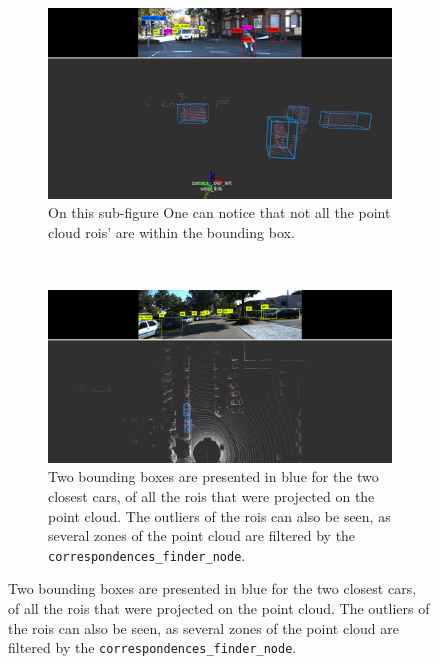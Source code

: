 \begin{figure}[!ht]\ContinuedFloat
	\centering	
	\begin{subfigure}[c]{0.8\textwidth}
		\includegraphics[width=\textwidth]{img/image-object-to-point-cloud/bboxes-front-view.png}
		\caption{On this sub-figure One can notice that not all the point cloud \acp{roi}' are within the bounding box.}
		\label{fig:bboxes-3d-kitti-front}
	\end{subfigure}
	\\ \vspace{4mm}
	\begin{subfigure}[c]{0.8\textwidth}
		\includegraphics[width=\textwidth]{img/image-object-to-point-cloud/bboxes-top-view.png}
		\caption{Two bounding boxes are presented in blue for the two closest cars, of all the \acp{roi} that were projected on the point cloud. The outliers of the \acp{roi} can also be seen, as several zones of the point cloud are filtered by the \texttt{correspondences\_finder\_node}.}
		\label{fig:bboxes-3d-kitti-top}
	\end{subfigure}

\end{figure}
